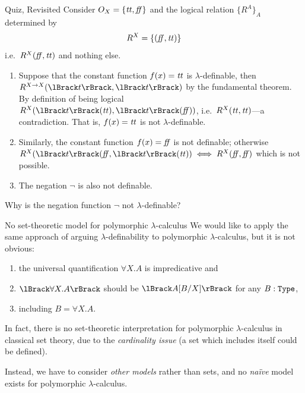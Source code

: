 \begin{frame}{Quiz, Revisited}
  Consider $O_X = \{\mathit{tt}, \mathit{ff}\}$ and the logical relation $\{R^A\}_{A}$ determined by
  \[
    R^{X} = \{(\mathit{ff}, \mathit{tt})\}
  \]
  i.e.\ $R^X(\mathit{ff}, \mathit{tt})$ and nothing else.

  \begin{enumerate}
    \item Suppose that the constant function $f(x) = \mathit{tt}$ is $\lambda$-definable, then $R^{X \to X}(\Brackets{t}, \Brackets{t})$ by the fundamental theorem.
      By definition of being logical $R^{X}(\Brackets{t}(\btt), \Brackets{t}(\bff))$, i.e.\ $R^{X}(\mathit{tt}, \mathit{tt})$---a contradiction.
      That is, $f(x) = \mathit{tt}$ is not $\lambda$-definable.

    \item Similarly, the constant function $f(x) = \mathit{ff}$ is not definable; otherwise $R^X(\Brackets{t}(\bff, \Brackets{t}(\btt)) \iff R^X(\bff, \bff)$ which is not possible.
    \item The negation $\neg$ is also not definable.
  \end{enumerate}

  \begin{exercise*}
    Why is the negation function $\neg$ not $\lambda$-definable?
  \end{exercise*}
\end{frame}

\begin{frame}{No set-theoretic model for polymorphic $\lambda$-calculus}
  We would like to apply the same approach of arguing $\lambda$-definability to polymorphic $\lambda$-calculus, but it is not obvious:
  \begin{enumerate}
    \item the universal quantification  $\forall X. A$ is \alert{impredicative} and
    \item $\Brackets{\forall X. A}$ should be $\Brackets{A \subst{B}{X}}$ for any $B : \mathtt{Type}$,
    \item including $B = \forall X. A$.
  \end{enumerate}

  In fact, there is no set-theoretic interpretation for polymorphic $\lambda$-calculus \cite{Reynolds1984} in classical set theory, due to the \emph{cardinality issue} (a set which includes itself could be defined).

  Instead, we have to consider \emph{other models} rather than sets, and no \emph{na\"ive} model exists for polymorphic $\lambda$-calculus.
\end{frame}

